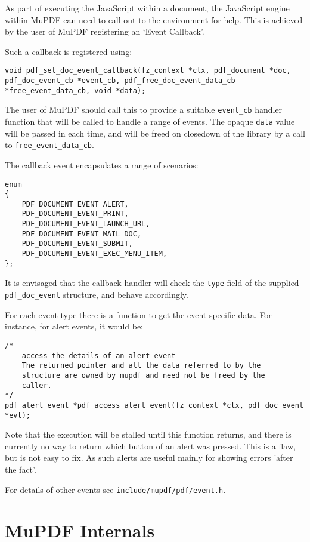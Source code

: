 \documentclass[oneside]{book}
\begin{document}
As part of executing the JavaScript within a document, the JavaScript engine within MuPDF can need to call out to the environment for help. This is achieved by the user of MuPDF registering an `Event Callback'.

Such a callback is registered using:

\begin{lstlisting}
void pdf_set_doc_event_callback(fz_context *ctx, pdf_document *doc, pdf_doc_event_cb *event_cb, pdf_free_doc_event_data_cb *free_event_data_cb, void *data);\end{lstlisting}

The user of MuPDF should call this to provide a suitable \texttt{event\_cb} handler function that will be called to handle a range of events. The opaque \texttt{data} value will be passed in each time, and will be freed on closedown of the library by a call to \texttt{free\_event\_data\_cb}.

The callback event encapsulates a range of scenarios:

\begin{lstlisting}
enum
{
	PDF_DOCUMENT_EVENT_ALERT,
	PDF_DOCUMENT_EVENT_PRINT,
	PDF_DOCUMENT_EVENT_LAUNCH_URL,
	PDF_DOCUMENT_EVENT_MAIL_DOC,
	PDF_DOCUMENT_EVENT_SUBMIT,
	PDF_DOCUMENT_EVENT_EXEC_MENU_ITEM,
};
\end{lstlisting}

It is envisaged that the callback handler will check the \texttt{type} field of the supplied \texttt{pdf\_doc\_event} structure, and behave accordingly.

For each event type there is a function to get the event specific data. For instance, for alert events, it would be:

\begin{lstlisting}
/*
	access the details of an alert event
	The returned pointer and all the data referred to by the
	structure are owned by mupdf and need not be freed by the
	caller.
*/
pdf_alert_event *pdf_access_alert_event(fz_context *ctx, pdf_doc_event *evt);
\end{lstlisting}

Note that the execution will be stalled until this function returns, and there is currently no way to return which button of an alert was pressed. This is a flaw, but is not easy to fix. As such alerts are useful mainly for showing errors 'after the fact'.

For details of other events see \texttt{include/mupdf/pdf/event.h}.

\part{MuPDF Internals}
\end{document}
